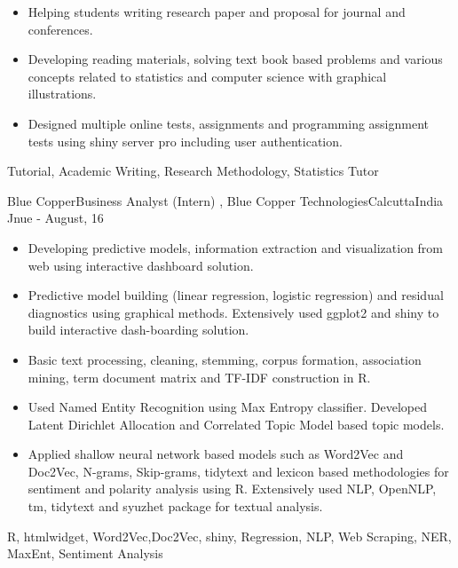 \begin{experiences}
{\begin{itemize}
                        \item Helping students writing research paper and proposal for journal and conferences.  
                        \item Developing reading materials, solving text book based problems and various concepts related to statistics and computer science with graphical illustrations.   
                        \item Designed multiple online tests, assignments and programming assignment tests using shiny server pro including user authentication.  
                      \end{itemize}
                    }
                    {Tutorial, Academic Writing, Research Methodology, Statistics Tutor}
  
  \emptySeparator
  \experience
    {Blue Copper}{Business Analyst (Intern) , Blue Copper Technologies}{Calcutta}{India}
    {Jnue - August, 16}    {
                      \begin{itemize}
                        \item Developing predictive models, information extraction and visualization from web using interactive dashboard solution.
                        \item Predictive model building (linear regression, logistic regression) and residual diagnostics using graphical methods. Extensively used ggplot2 and shiny to build interactive dash-boarding solution.
                        
                        \item Basic text processing, cleaning, stemming, corpus formation, association mining, term document matrix and TF-IDF construction in R. 
                        
                        \item Used Named Entity Recognition using Max Entropy classifier. Developed Latent Dirichlet Allocation and Correlated Topic Model based topic models.       
                        
                        \item Applied shallow neural network based models such as Word2Vec and Doc2Vec, N-grams, Skip-grams, tidytext and lexicon based methodologies for sentiment and polarity analysis using R. Extensively used NLP, OpenNLP, tm, tidytext and  syuzhet package for textual analysis.                
                      \end{itemize}
                    }
                    {R, htmlwidget, Word2Vec,Doc2Vec, shiny, Regression, NLP, Web Scraping, NER, MaxEnt, Sentiment Analysis}
\end{experiences}

